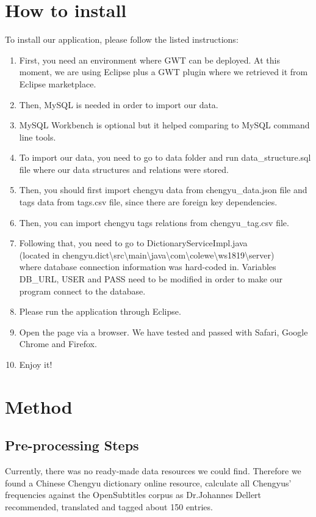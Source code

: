 \documentclass[11pt]{article} %
\begin{document}
\section{How to install}
To install our application, please follow the listed instructions:

\begin{enumerate}
  \item First, you need an environment where GWT can be deployed. At this moment, we are using Eclipse plus a GWT plugin where we retrieved it from Eclipse marketplace.
  \item Then, MySQL is needed in order to import our data.
  \item MySQL Workbench is optional but it helped comparing to MySQL command line tools.
  \item To import our data, you need to go to data folder and run data\_structure.sql file where our data structures and relations were stored.
  \item Then, you should first import chengyu data from chengyu\_data.json file and tags data from tags.csv file, since there are foreign key dependencies.
  \item Then, you can import chengyu tags relations from chengyu\_tag.csv file.
  \item Following that, you need to go to DictionaryServiceImpl.java \\(located in chengyu.dict\textbackslash src\textbackslash main\textbackslash java\textbackslash com\textbackslash colewe\textbackslash ws1819\textbackslash server)\\ where database connection information was hard-coded in. Variables DB\_URL, USER and PASS need to be modified in order to make our program connect to the database.
  \item Please run the application through Eclipse.
  \item Open the page  via a browser. We have tested and passed with Safari, Google Chrome and Firefox.
  \item Enjoy it!
\end{enumerate}

\section{Method}
\subsection{Pre-processing Steps}
\indent Currently, there was no ready-made data resources we could find. Therefore we found a Chinese Chengyu dictionary online resource, calculate all Chengyus' frequencies against the OpenSubtitles corpus as Dr.Johannes Dellert recommended, translated and tagged about 150 entries.
\end{document}
